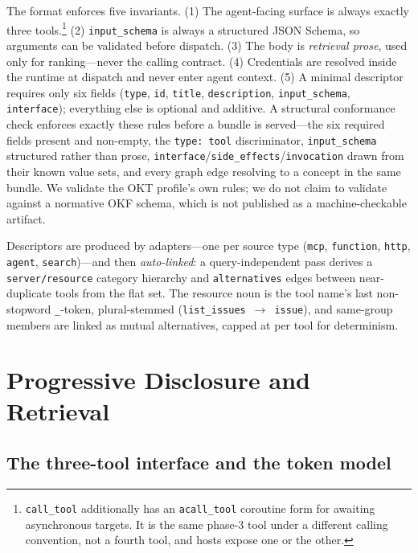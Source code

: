 \documentclass[11pt]{article}
\begin{document}
The format enforces five invariants. (1) The agent-facing surface is always
exactly three tools.\footnote{\texttt{call\_tool} additionally has an
\texttt{acall\_tool} coroutine form for awaiting asynchronous targets. It is the
same phase-3 tool under a different calling convention, not a fourth tool, and
hosts expose one or the other.} (2) \texttt{input\_schema} is always a structured
JSON Schema, so arguments can be validated before dispatch. (3) The body is
\emph{retrieval prose}, used only for ranking---never the calling contract.
(4) Credentials are resolved inside the runtime at dispatch and never enter agent
context. (5) A minimal descriptor requires only six fields
(\texttt{type}, \texttt{id}, \texttt{title}, \texttt{description},
\texttt{input\_schema}, \texttt{interface}); everything else is optional and
additive. A structural conformance check enforces exactly these rules before a
bundle is served---the six required fields present and non-empty, the
\texttt{type:\,tool} discriminator, \texttt{input\_schema} structured rather than
prose, \texttt{interface}/\texttt{side\_effects}/\texttt{invocation} drawn from
their known value sets, and every graph edge resolving to a concept in the same
bundle. We validate the OKT profile's own rules; we do not claim to validate
against a normative OKF schema, which is not published as a machine-checkable
artifact.

Descriptors are produced by adapters---one per source type
(\texttt{mcp}, \texttt{function}, \texttt{http}, \texttt{agent},
\texttt{search})---and then \emph{auto-linked}: a query-independent pass derives a
\texttt{server/resource} category hierarchy and \texttt{alternatives} edges
between near-duplicate tools from the flat set. The resource noun is the tool
name's last non-stopword \texttt{\_}-token, plural-stemmed
(\texttt{list\_issues}~$\rightarrow$~\texttt{issue}), and same-group members are
linked as mutual alternatives, capped at \maxAlternatives{} per tool for
determinism.

\section{Progressive Disclosure and Retrieval}
\label{sec:method}

\subsection{The three-tool interface and the token model}
\end{document}

